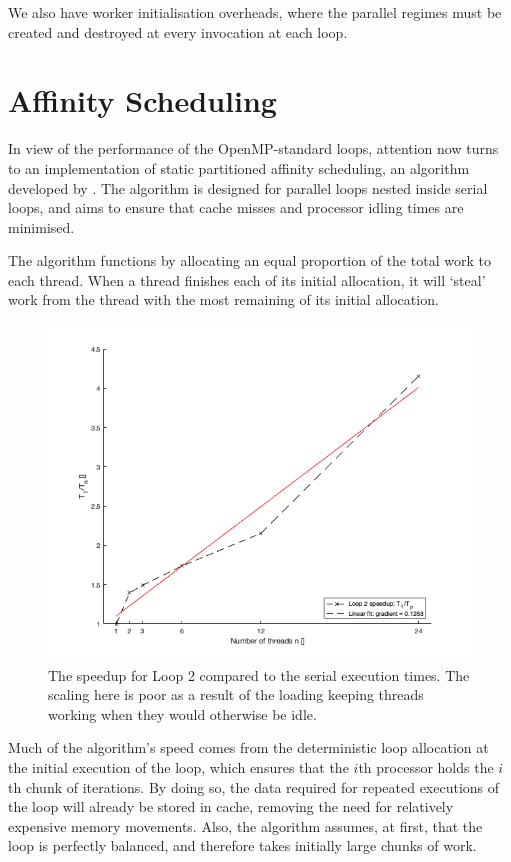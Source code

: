 \documentclass{article} %
\begin{document}
We also have worker initialisation overheads, where the parallel regimes must be created and destroyed at every invocation at each loop.

\section*{Affinity Scheduling}

In view of the performance of the OpenMP-standard loops, attention now turns to an implementation of static partitioned affinity scheduling, an algorithm developed by \citet{273046}.
The algorithm is designed for parallel loops nested inside serial loops, and aims to ensure that cache misses and processor idling times are minimised.

The algorithm functions by allocating an equal proportion of the total work to each thread. 
When a thread finishes each of its initial allocation, it will `steal' work from the thread with the most remaining of its initial allocation.

\begin{figure}
    \centering
    \includegraphics[height=.35\textheight]{part1_plots/loop2_speedup.png}
    \caption{The speedup for Loop 2 compared to the serial execution times. The scaling here is poor as a result of the loading keeping threads working when they would otherwise be idle.}
    \label{fig:loop2speedup}
\end{figure}

Much of the algorithm's speed comes from the deterministic loop allocation at the initial execution of the loop, which ensures that the $i$th processor holds the $i$th chunk of iterations.
By doing so, the data required for repeated executions of the loop will already be stored in cache, removing the need for relatively expensive memory movements.
Also, the algorithm assumes, at first, that the loop is perfectly balanced, and therefore takes initially large chunks of work.
\end{document}
